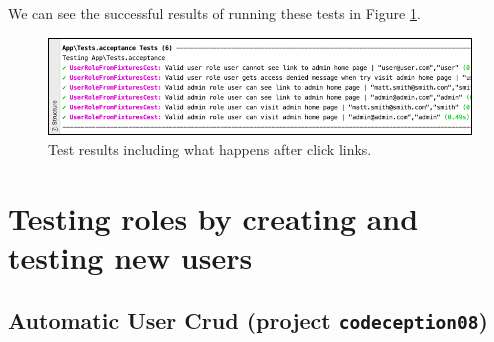 \documentclass[a4paperpaper,openright]{book}
\newenvironment{Shaded}{}{}
\newcommand{\CommentTok}[1]{\textcolor[rgb]{0.38,0.63,0.69}{\textit{#1}}}
\newcommand{\KeywordTok}[1]{\textcolor[rgb]{0.00,0.44,0.13}{\textbf{#1}}}
\newcommand{\NormalTok}[1]{#1}
\newcommand{\OtherTok}[1]{\textcolor[rgb]{0.00,0.44,0.13}{#1}}
\newcommand{\StringTok}[1]{\textcolor[rgb]{0.25,0.44,0.63}{#1}}
\begin{document}
\begin{Shaded}
\end{Shaded}

We can see the successful results of running these tests in Figure
\ref{postLinkTests}.

\begin{figure}
\centering
\includegraphics{./tex2pdf.-d01fd108a306454d/87bd300b7a127998c328c97dfd1f26da408589f7.png}
\caption{Test results including what happens after click
links.\label{postLinkTests}}
\end{figure}

\hypertarget{testing-roles-by-creating-and-testing-new-users}{%
\chapter{Testing roles by creating and testing new
users}\label{testing-roles-by-creating-and-testing-new-users}}

\hypertarget{automatic-user-crud-project-codeception08}{%
\section{\texorpdfstring{Automatic User Crud (project
\texttt{codeception08})}{Automatic User Crud (project codeception08)}}\label{automatic-user-crud-project-codeception08}}
\end{document}
